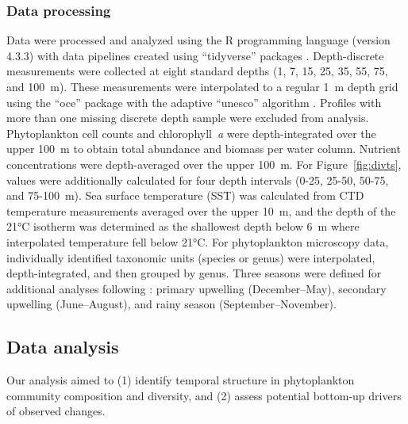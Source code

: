 \documentclass[]{agujournal2019}
\begin{document}
    \subsubsection{Data processing}
    Data were processed and analyzed using the R programming language (version 4.3.3) \cite{r_core_team_r_2024} with data pipelines created using ``tidyverse'' packages \cite{wickham_welcome_2019}.  Depth-discrete measurements were collected at eight standard depths (1, 7, 15, 25, 35, 55, 75, and 100~m). These measurements were interpolated to a regular 1~m depth grid using the ``oce'' package \cite{kelley_oce_2023} with the adaptive ``unesco'' algorithm \cite{johnson_world_2006}. Profiles with more than one missing discrete depth sample were excluded from analysis. Phytoplankton cell counts and chlorophyll~\textit{a} were depth-integrated over the upper 100~m to obtain total abundance and biomass per water column. Nutrient concentrations were depth-averaged over the upper 100~m. For Figure~\ref{fig:divts}, values were additionally calculated for four depth intervals (0-25, 25-50, 50-75, and 75-100~m). Sea surface temperature (SST) was calculated from CTD temperature measurements averaged over the upper 10~m, and the depth of the 21°C isotherm was determined as the shallowest depth below 6~m where interpolated temperature fell below 21°C. For phytoplankton microscopy data, individually identified taxonomic units (species or genus) were interpolated, depth-integrated, and then grouped by genus.  
    Three seasons were defined for additional analyses following \cite{muller-karger_scientific_2019}: primary upwelling (December–May), secondary upwelling (June–August),  and rainy season (September–November).
    



\subsection{Data analysis}   
 
    Our analysis aimed to (1) identify temporal structure in phytoplankton community composition and diversity, and (2) assess potential bottom-up drivers of observed changes.
    
\end{document}
